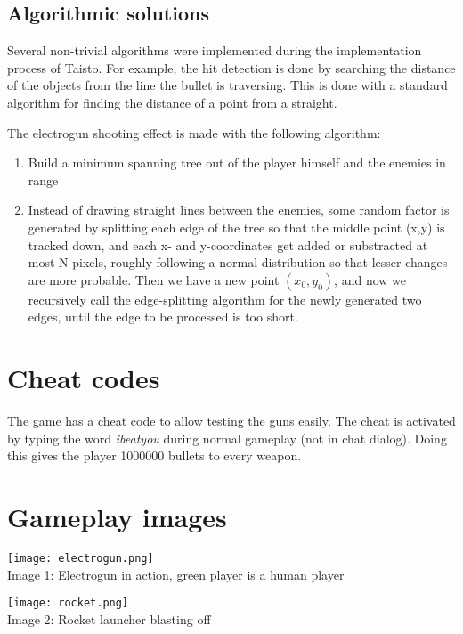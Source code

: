 \documentclass[a4paper,12pt,titlepage]{article}
\begin{document}
\subsection {Algorithmic solutions}
Several non-trivial algorithms were implemented during the implementation 
process of Taisto. For example, the hit detection is done by searching the 
distance of the objects from the line the bullet is traversing. This is done
with a standard algorithm for finding the distance of a point from a straight.

The electrogun shooting effect is made with the following algorithm:
\begin{enumerate}
\item Build a minimum spanning tree out of the player himself and the enemies
in range
\item Instead of drawing straight lines between the enemies, some random factor
is generated by splitting each edge of the tree so that the middle point (x,y)
is tracked down, and each x- and y-coordinates get added or substracted at most
N pixels, roughly following a normal distribution so that lesser changes are
more probable. Then we have a new point $(x_0,y_0)$, and now we recursively
call the edge-splitting algorithm for the newly generated two edges, until the
edge to be processed is too short.
\end{enumerate}


\appendix
\section{Cheat codes}
The game has a cheat code to allow testing the guns easily. The cheat is activated by typing the word \emph{ibeatyou} during normal gameplay (not in chat dialog). Doing this gives the player 1000000 bullets to every weapon.

\section{Gameplay images}
\begin{center}
\texttt{[image: electrogun.png]}
\\
Image 1: Electrogun in action, green player is a human player
\end{center}
\begin{center}
\texttt{[image: rocket.png]}
\\
Image 2: Rocket launcher blasting off
\end{center}
\end{document}
